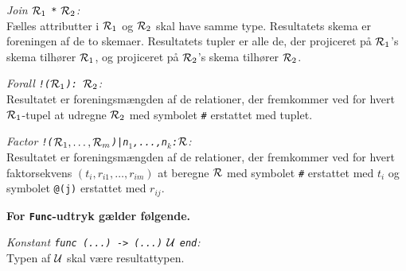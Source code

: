 {\em Join ${\cal R}_1$ \verb"*" ${\cal R}_2$:}\\
F\ae{}lles attributter i ${\cal R}_1$ og ${\cal R}_2$ skal have samme type.
Resultatets skema er foreningen af de to skemaer. 
Resultatets tupler er alle de, der projiceret p\aa{}
${\cal R}_1$'s skema tilh\o{}rer ${\cal R}_1$, og projiceret p\aa{}
${\cal R}_2$'s skema tilh\o{}rer ${\cal R}_2$.

{\em Forall \verb"!("${\cal R}_1$\verb"): "${\cal R}_2$:}\\
Resultatet er foreningsm\ae{}ngden af de relationer, 
der fremkommer ved for hvert
${\cal R}_1$-tupel at  udregne ${\cal R}_2$ med symbolet
\verb"#" erstattet med tuplet.

{\em Factor \verb"!("${\cal R}_1,\ldots,{\cal R}_m$\verb")|"\verb"n"$_1$\verb",...,n"$_k$\verb":"${\cal R}$:}\\
Resultatet er foreningsm\ae{}ngden af de relationer,
der fremkommer ved for hvert faktorsekvens $(t_i,r_{i1},\ldots,r_{im})$ at
beregne ${\cal R}$ med symbolet
\verb"#" erstattet med $t_i$ og symbolet \verb"@(j)" erstattet med $r_{ij}$.

{\bf For \verb"Func"-udtryk g\ae{}lder f\o{}lgende.}

{\em Konstant \verb"func (...) -> (...)" $\cal U$ \verb"end":}\\
Typen af $\cal U$ skal v\ae{}re resultattypen.

